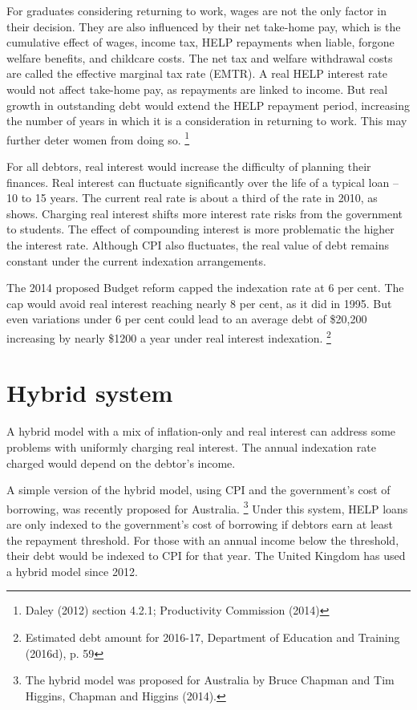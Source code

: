 \documentclass[embargoed]{grattan}
\begin{document}
For graduates considering returning to work, wages are not the only factor in their decision.
They are also influenced by their net take-home pay, which is the cumulative effect of wages, income tax, \gls{HELP} repayments when liable, forgone welfare benefits, and childcare costs.
The net tax and welfare withdrawal costs are called the effective marginal tax rate (EMTR).
A real \gls{HELP} interest rate would not affect take-home pay, as repayments are linked to income.
But real growth in outstanding debt would extend the \gls{HELP} repayment period, increasing the number of years in which it is a consideration in returning to work.
This may further deter women from doing so.%
\footnote{Daley (2012) section 4.2.1; Productivity Commission (2014)}


For all debtors, real interest would increase the difficulty of planning their finances.
Real interest can fluctuate significantly over the life of a typical loan -- 10 to 15 years.
The current real rate is about a third of the rate in 2010, as  shows.
Charging real interest shifts more interest rate risks from the government to students.
The effect of compounding interest is more problematic the higher the interest rate.
Although \gls{CPI} also fluctuates, the real value of debt remains constant under the current indexation arrangements.

The 2014 proposed Budget reform capped the indexation rate at 6 per cent.
The cap would avoid real interest reaching nearly 8 per cent, as it did in 1995.
But even variations under 6 per cent could lead to an average debt of \$20,200 increasing by nearly \$1200 a year under real interest indexation.%
\footnote{Estimated debt amount for 2016-17, Department of Education and Training (2016d), p. 59}

\section{Hybrid system}\label{sec:hybrid-system}

A hybrid model with a mix of inflation-only and real interest can address some problems with uniformly charging real interest.
The annual indexation rate charged would depend on the debtor's income.

A simple version of the hybrid model, using \gls{CPI} and the government's cost of borrowing, was recently proposed for Australia.%
\footnote{The hybrid model was proposed for Australia by Bruce Chapman and Tim Higgins, Chapman and Higgins (2014).} Under this system, \gls{HELP} loans are only indexed to the government's cost of borrowing if debtors earn at least the repayment threshold.
For those with an annual income below the threshold, their debt would be indexed to \gls{CPI} for that year.
The United Kingdom has used a hybrid model since 2012.
\end{document}
